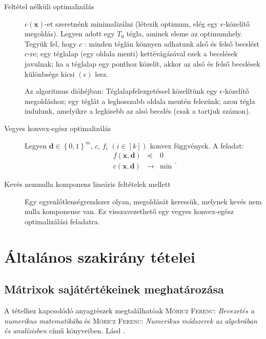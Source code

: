 \documentclass[DIV=15,appendixprefix]{scrreprt}
\theoremstyle{definition}
\theoremstyle{remark}
\begin{document}
%
\begin{description}
	\item[Feltétel nélküli optimalizálás] $ c \left( \mathbf{ x } \right) $-et szeretnénk
		minimalizálni (létezik optimum, elég egy $ \epsilon $-kö\-ze\-lí\-tő megoldás). Legyen adott egy
		$ T_{ 0 } $ tégla, aminek eleme az optimumhely. Tegyük fel, hogy $ c $ : minden
		téglán könnyen adhatunk alső és felső becslést $ c $-re; egy téglalap (egy oldala menti)
		kettévágásával ezek a becslések javulnak; ha a téglalap egy ponthoz közelít, akkor az alsó
		és felső becslések különbsége kicsi $ \left( \epsilon \right) $ lesz.

		Az algoritmus dióhéjban: Téglalapfelezgetéssel közelítünk egy $ \epsilon $-közelítő
		megoldáshoz; egy téglát a leghosszabb oldala mentén felezünk; azon tégla 
		indulunk, amelyikre a legkisebb az alsó becslés (csak a  tartjuk számon).
	\item[Vegyes konvex-egész optimalizálás] Legyen $ \mathbf{ d } \in \left\{ 0,{} 1
		\right\}^{ m } $, $ c $, $ f_{ i } $ $ \left( i \in \left[ k \right] \right) $ konvex függvények. A feladat:
		\begin{equation*}
			\begin{array}{rcl}
				f \left( \mathbf{ x },{} \mathbf{ d } \right) 	&	\preceq			& 0\\
				\hline
				c \left( \mathbf{ x },{} \mathbf{ d } \right) 	&	\rightarrow	&	\min
			\end{array}.
		\end{equation*}
	\item[Kevés nemnulla komponens lineáris feltételek mellett] Egy egyenlőtlenségrendszer olyan,
	megoldását keressük, melynek kevés nem nulla komponense van. Ez visszavezethető egy vegyes
	konvex-egész optimalizálási feladatra.
\end{description}
%
%
%
\chapter{Általános szakirány tételei}
%
\section{Mátrixok sajátértékeinek meghatározása}
%
A tételhez kapcsolódó anyagrészek megtalálhatóak \textsc{Móricz Ferenc}: \emph{Bevezetés a numerikus
matematikába} \cite{Moricz2008} és \textsc{Móricz Ferenc}: \emph{Numerikus módszerek az algebrában
és analízisben} \cite{Moricz1997} című könyveiben.
%
Lásd \cite[I. fejezet, 1. szakasz]{Moricz1997}.
\end{document}
